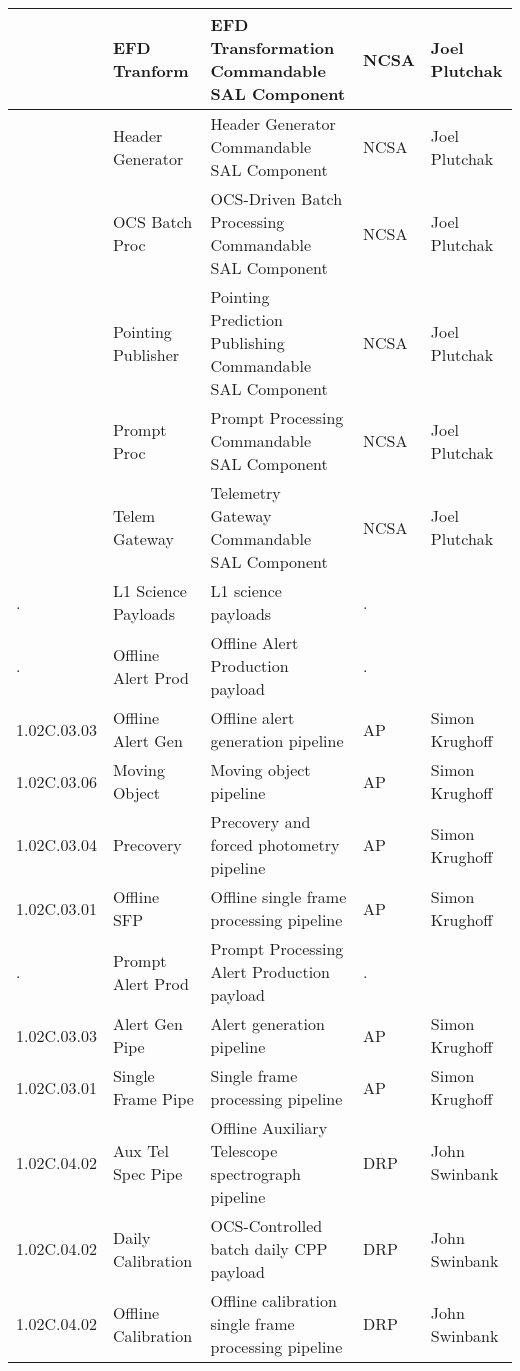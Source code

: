 \begin{longtable}{|p{}|p{}|p{}|p{}|p{}|}
{\tiny } & \small EFD Tranform & EFD Transformation Commandable SAL Component & NCSA & Joel Plutchak\\ \hline 
{\tiny } & \small Header Generator & Header Generator Commandable SAL Component & NCSA & Joel Plutchak\\ \hline 
{\tiny } & \small OCS Batch Proc & OCS-Driven Batch Processing Commandable SAL Component & NCSA & Joel Plutchak\\ \hline 
{\tiny } & \small Pointing Publisher & Pointing Prediction Publishing Commandable SAL Component & NCSA & Joel Plutchak\\ \hline 
{\tiny } & \small Prompt Proc & Prompt Processing Commandable SAL Component & NCSA & Joel Plutchak\\ \hline 
{\tiny } & \small Telem Gateway & Telemetry Gateway Commandable SAL Component & NCSA & Joel Plutchak\\ \hline 
{\tiny .} & \small L1 Science Payloads & L1 science payloads & . & \\ \hline 
{\tiny .} & \small Offline Alert Prod & Offline Alert Production payload & . & \\ \hline 
{\tiny 1.02C.03.03} & \small Offline Alert Gen & Offline alert generation pipeline & AP & Simon Krughoff\\ \hline 
{\tiny 1.02C.03.06} & \small Moving Object & Moving object pipeline & AP & Simon Krughoff\\ \hline 
{\tiny 1.02C.03.04} & \small Precovery & Precovery and forced photometry pipeline & AP & Simon Krughoff\\ \hline 
{\tiny 1.02C.03.01} & \small Offline SFP & Offline single frame processing pipeline & AP & Simon Krughoff\\ \hline 
{\tiny .} & \small Prompt Alert Prod & Prompt Processing Alert Production payload & . & \\ \hline 
{\tiny 1.02C.03.03} & \small Alert Gen Pipe & Alert generation pipeline & AP & Simon Krughoff\\ \hline 
{\tiny 1.02C.03.01} & \small Single Frame Pipe & Single frame processing pipeline & AP & Simon Krughoff\\ \hline 
{\tiny 1.02C.04.02} & \small Aux Tel Spec Pipe & Offline Auxiliary Telescope spectrograph pipeline & DRP & John Swinbank\\ \hline 
{\tiny 1.02C.04.02} & \small Daily Calibration & OCS-Controlled batch daily CPP payload & DRP & John Swinbank\\ \hline 
{\tiny 1.02C.04.02} & \small Offline Calibration & Offline calibration single frame processing pipeline & DRP & John Swinbank\\ \hline 

\end{longtable}
